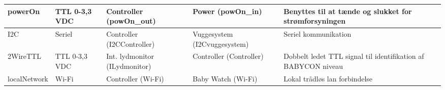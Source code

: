 \begin{center}
\begin{longtable}{|p{}|p{}|p{}|p{}|p{3cm}|}
powerOn			
&TTL 0-3,3 VDC				
&Controller \newline (powOn\_out) 			
&Power \newline (powOn\_in)	
&Benyttes til at tænde og slukket for strømforsyningen   		\\\hline

I2C			
&Seriel				
&Controller \newline (I2CController) 			
&Vuggesystem \newline (I2Cvuggesystem) 	
&Seriel kommunikation
\\\hline

2WireTTL			
&TTL 0-3,3 VDC					
&Int. lydmonitor \newline (ILydmonitor) 			
&Controller \newline (Controller) 	
&Dobbelt ledet TTL signal til identifikation af BABYCON niveau
\\\hline

localNetwork			
&Wi-Fi				
&Controller \newline (Wi-Fi) 			
&Baby Watch \newline (Wi-Fi)	
&Lokal trådløs lan forbindelse   				\\\hline

\end{longtable}
\end{center}